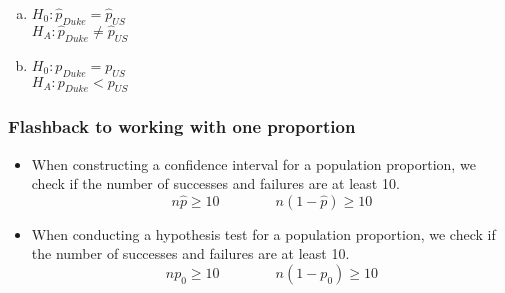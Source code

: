 \begin{frame}


\begin{enumerate}[(a)]
\item $H_0:  \hat{p}_{Duke} = \hat{p}_{US}$ \\
$H_A:  \hat{p}_{Duke} \ne \hat{p}_{US}$
\item $H_0:  p_{Duke} = p_{US}$ \\
$H_A:  p_{Duke} < p_{US}$
\end{enumerate}


\end{frame}


\begin{frame}
\frametitle{Flashback to working with one proportion}

\begin{itemize}

\item When constructing a confidence interval for a population proportion, we check if the  number of successes and failures are at least 10.
\[ n\hat{p} \ge 10 \qquad \qquad n(1-\hat{p}) \ge 10 \]

\pause

\item When conducting a hypothesis test for a population proportion, we check if the  number of successes and failures are at least 10.
\[ np_0 \ge 10 \qquad \qquad n(1-p_0) \ge 10 \]

\end{itemize}

\end{frame}


